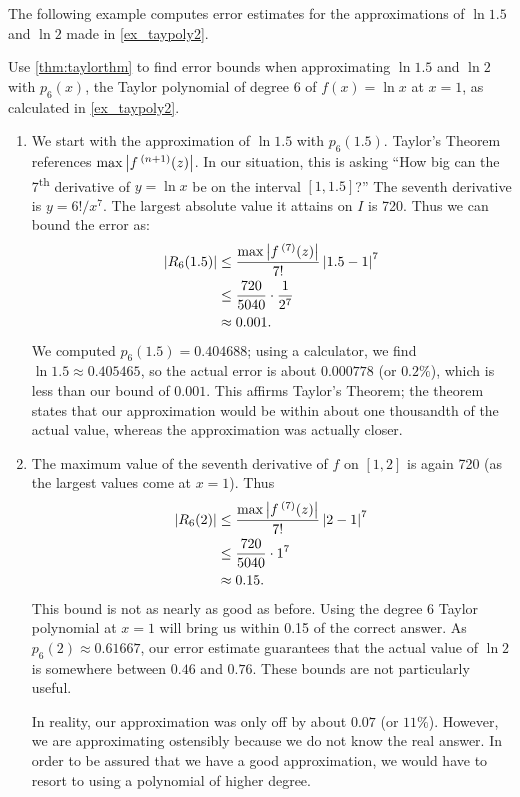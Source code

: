 The following example computes error estimates for the approximations of $\ln 1.5$ and $\ln 2$ made in \autoref{ex_taypoly2}.

\begin{example}\label{ex_taypoly3}%
Use \autoref{thm:taylorthm} to find error bounds when approximating $\ln 1.5$ and $\ln 2$ with $p_6(x)$, the Taylor polynomial of degree 6 of $f(x)=\ln x$ at $x=1$, as calculated in \autoref{ex_taypoly2}.
\solution
\begin{enumerate}
\item	We start with the approximation of $\ln 1.5$ with $p_6(1.5)$.
%
Taylor's Theorem references $\max\left\lvert f\,^{(n+1)}(z) \right\rvert$. In our situation, this is asking ``How big can the 7\textsuperscript{th} derivative of $y=\ln x$ be on the interval $[1,1.5]$?'' The seventh derivative is $y = 6!/x^7$. The largest absolute value it attains on $I$ is 720. Thus we can bound the error as:
\begin{align*}
	\left\lvert R_6(1.5) \right\rvert
	&\leq \frac{\max\left\lvert f\,^{(7)}(z) \right\rvert}{7!}\left\lvert 1.5-1 \right\rvert^7\\
	&\leq \frac{720}{5040}\cdot\frac1{2^7}\\
	&\approx 0.001.
\end{align*}
We computed $p_6(1.5) = 0.404688$; using a calculator, we find $\ln 1.5 \approx 0.405465$, so the actual error is about $0.000778$ (or $0.2\%$), which is less than our bound of $0.001$. This affirms Taylor's Theorem; the theorem states that our approximation would be within about one thousandth of the actual value, whereas the approximation was actually closer.

	\item	%
	The maximum value of the seventh derivative of $f$ on $[1,2]$ %
	is again 720 (as the largest values come at $x=1$). Thus 
\begin{align*}
	\left\lvert R_6(2) \right\rvert
	&\leq \frac{\max\left\lvert f\,^{(7)}(z) \right\rvert}{7!}\left\lvert 2-1 \right\rvert^7\\
	&\leq \frac{720}{5040}\cdot1^7\\
	&\approx0.15.
\end{align*}
This bound is not as nearly as good as before. Using the degree 6 Taylor polynomial at $x =1$ will bring us within 0.15 of the correct answer. As $p_6(2)\approx 0.61667$, our error estimate guarantees that the actual value of $\ln 2$ is somewhere between $0.46$ and $0.76$. These bounds are not particularly useful.

In reality, our approximation was only off by about $0.07$ (or $11\%$). However, we are approximating ostensibly because we do not know the real answer. In order to be assured that we have a good approximation, we would have to resort to using a polynomial of higher degree.
\end{enumerate}
\end{example}

